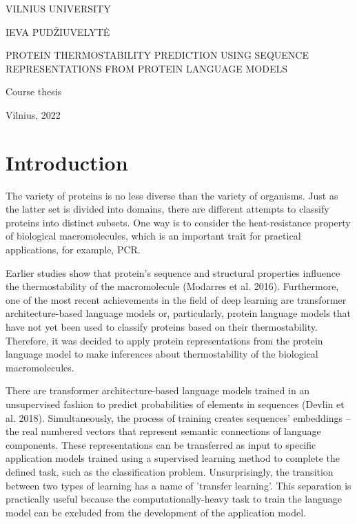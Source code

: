 \documentclass[12pt]{report}
\begin{document}
	\begin{center}
	    \vspace*{1cm}
	    \Large
	    VILNIUS UNIVERSITY
	    
	    \vspace*{4cm}
        \Large
        IEVA PUDŽIUVELYTĖ
	    
        \vspace*{2cm}
        \Large
        PROTEIN THERMOSTABILITY PREDICTION USING 
		SEQUENCE REPRESENTATIONS FROM PROTEIN 
		LANGUAGE MODELS 
        
        \vspace*{2cm}
        \large
        Course thesis
        
        \vspace*{2cm}
        \large
        Vilnius, 2022
        
	\end{center}
	
	\newpage

	\tableofcontents

	\newpage
	
	\Large
	\section{Introduction}

    \vspace*{1cm}
        
	\normalsize

	The variety of proteins is no less diverse than the variety of organisms. 
	Just as the latter set is divided into domains, there are different 
	attempts to classify proteins into distinct subsets. One way is to 
	consider the heat-resistance property of biological macromolecules, which 
	is an important trait for practical applications, for example, PCR.

	Earlier studies show that protein's sequence and structural properties 
	influence the thermostability of the macromolecule (Modarres et al. 2016). 
	Furthermore, one of the most recent achievements in the field of deep 
	learning are transformer architecture-based language models or, particularly, 
	protein language models that have not yet been used to classify proteins based on
	their thermostability. Therefore, it was decided to apply protein 
	representations from the protein language model to make inferences about 
	thermostability of the biological macromolecules.

	There are transformer architecture-based language models trained in an 
	unsupervised fashion to predict probabilities of elements in sequences 
	(Devlin et al. 2018). 
	Simultaneously, the process of training creates sequences' embeddings – the 
	real numbered vectors that represent semantic connections of language 
	components. These representations can be transferred as input to specific 
	application models trained using a supervised learning method to complete 
	the defined task, such as the classification problem. Unsurprisingly, the 
	transition between two types of learning has a name of 'transfer learning'. 
	This separation is practically useful because the computationally-heavy 
	task to train the language model can be excluded from the development of 
	the application model.
\end{document}
